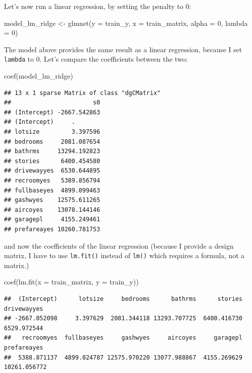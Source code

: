 \documentclass[
]{article}
\newenvironment{Shaded}{\begin{snugshade}}{\end{snugshade}}
\newcommand{\AttributeTok}[1]{\textcolor[rgb]{0.77,0.63,0.00}{#1}}
\newcommand{\DecValTok}[1]{\textcolor[rgb]{0.00,0.00,0.81}{#1}}
\newcommand{\FunctionTok}[1]{\textcolor[rgb]{0.00,0.00,0.00}{#1}}
\newcommand{\NormalTok}[1]{#1}
\newcommand{\OtherTok}[1]{\textcolor[rgb]{0.56,0.35,0.01}{#1}}
\begin{document}
Let's now run a linear regression, by setting the penalty to 0:

\begin{Shaded}
\begin{Highlighting}[]
\NormalTok{model\_lm\_ridge }\OtherTok{\textless{}{-}} \FunctionTok{glmnet}\NormalTok{(}\AttributeTok{y =}\NormalTok{ train\_y, }\AttributeTok{x =}\NormalTok{ train\_matrix, }\AttributeTok{alpha =} \DecValTok{0}\NormalTok{, }\AttributeTok{lambda =} \DecValTok{0}\NormalTok{)}
\end{Highlighting}
\end{Shaded}

The model above provides the same result as a linear regression, because I set \texttt{lambda} to 0. Let's
compare the coefficients between the two:

\begin{Shaded}
\begin{Highlighting}[]
\FunctionTok{coef}\NormalTok{(model\_lm\_ridge)}
\end{Highlighting}
\end{Shaded}

\begin{verbatim}
## 13 x 1 sparse Matrix of class "dgCMatrix"
##                       s0
## (Intercept) -2667.542863
## (Intercept)     .       
## lotsize         3.397596
## bedrooms     2081.087654
## bathrms     13294.192823
## stories      6400.454580
## drivewayyes  6530.644895
## recroomyes   5389.856794
## fullbaseyes  4899.099463
## gashwyes    12575.611265
## aircoyes    13078.144146
## garagepl     4155.249461
## prefareayes 10260.781753
\end{verbatim}

and now the coefficients of the linear regression (because I provide a design matrix, I have to use
\texttt{lm.fit()} instead of \texttt{lm()} which requires a formula, not a matrix.)

\begin{Shaded}
\begin{Highlighting}[]
\FunctionTok{coef}\NormalTok{(}\FunctionTok{lm.fit}\NormalTok{(}\AttributeTok{x =}\NormalTok{ train\_matrix, }\AttributeTok{y =}\NormalTok{ train\_y))}
\end{Highlighting}
\end{Shaded}

\begin{verbatim}
##  (Intercept)      lotsize     bedrooms      bathrms      stories  drivewayyes 
## -2667.052098     3.397629  2081.344118 13293.707725  6400.416730  6529.972544 
##   recroomyes  fullbaseyes     gashwyes     aircoyes     garagepl  prefareayes 
##  5388.871137  4899.024787 12575.970220 13077.988867  4155.269629 10261.056772
\end{verbatim}
\end{document}
